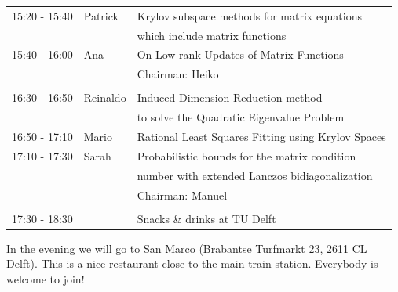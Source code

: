 \documentclass{article}
\begin{document}
\begin{table}[h]
\begin{tabular}{lll}
15:20 - 15:40 & Patrick & Krylov subspace methods for matrix equations \\
                  & & which include matrix functions\\ [0.5ex]
15:40 - 16:00 & Ana & On Low-rank Updates of Matrix Functions\\ [0.5ex]
& & \hfill \small{Chairman: Heiko}  \\
\hline \\ [-1.5ex]
16:30 - 16:50 & Reinaldo & Induced Dimension Reduction method \\
            & & to solve the Quadratic Eigenvalue Problem \\ [0.5ex]
16:50 - 17:10 & Mario & Rational Least Squares Fitting using Krylov Spaces\\ [0.5ex]
17:10 - 17:30 & Sarah & Probabilistic bounds for the matrix condition  \\
                    & & number with extended Lanczos bidiagonalization\\ [0.5ex]
& & \hfill \small{Chairman: Manuel}\\
\hline \\ [-1.5ex]
17:30 - 18:30 & & Snacks \& drinks at TU Delft
\end{tabular}
\end{table}

In the evening we will go to \href{http://www.sanmarco.nl/pizzeria/}{San Marco} (Brabantse Turfmarkt 23, 2611 CL Delft). This is a nice restaurant close to the main train station. Everybody is welcome to join!
\end{document}
